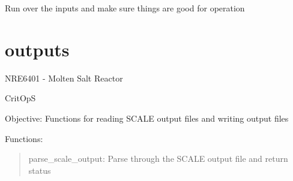 \documentclass[letterpaper,10pt,english]{sphinxmanual}
\begin{document}

\begin{fulllineitems}
\label{\detokenize{readinputs:critops.readinputs.check_inputs}}
Run over the inputs and make sure things are good for operation

\end{fulllineitems}



\chapter{outputs}
\label{\detokenize{outputs:module-critops.outputs}}\label{\detokenize{outputs:outputs}}\label{\detokenize{outputs::doc}}
NRE6401 - Molten Salt Reactor

CritOpS

Objective: Functions for reading SCALE output files and writing output files

Functions:
\begin{quote}

parse\_scale\_output: Parse through the SCALE output file and return status
\end{quote}
\end{document}
